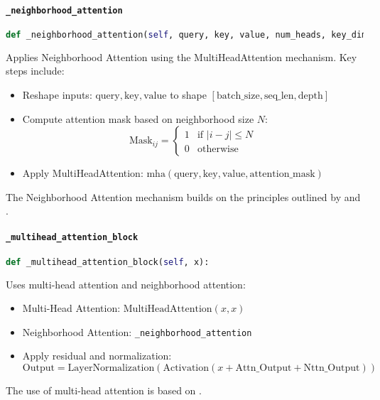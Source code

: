 \documentclass{article}
\begin{document}
	\paragraph{\texttt{\_neighborhood\_attention}}
	\begin{lstlisting}[language=Python]
		def _neighborhood_attention(self, query, key, value, num_heads, key_dim, neighborhood_size, dropout_rate=0.1):
	\end{lstlisting}
	Applies Neighborhood Attention using the MultiHeadAttention mechanism. Key steps include:
	\begin{itemize}
		\item Reshape inputs: \(\text{query}, \text{key}, \text{value}\) to shape \([ \text{batch\_size}, \text{seq\_len}, \text{depth} ]\)
		\item Compute attention mask based on neighborhood size \(N\):
		\[
		\text{Mask}_{ij} = 
		\begin{cases} 
			1 & \text{if } |i - j| \leq N \\
			0 & \text{otherwise}
		\end{cases}
		\]
		\item Apply MultiHeadAttention: \(\text{mha}(\text{query}, \text{key}, \text{value}, \text{attention\_mask})\)
	\end{itemize}
	The Neighborhood Attention mechanism builds on the principles outlined by \cite{vaswani2017attention} and \cite{parmar2018image}.
	
	\paragraph{\texttt{\_multihead\_attention\_block}}
	\begin{lstlisting}[language=Python]
		def _multihead_attention_block(self, x):
	\end{lstlisting}
	Uses multi-head attention and neighborhood attention:
	\begin{itemize}
		\item Multi-Head Attention: \( \text{MultiHeadAttention}(x, x) \)
		\item Neighborhood Attention: \texttt{\_neighborhood\_attention}
		\item Apply residual and normalization:
		\[
		\text{Output} = \text{LayerNormalization}(\text{Activation}(x + \text{Attn\_Output} + \text{Nttn\_Output}))
		\]
	\end{itemize}
	The use of multi-head attention is based on \cite{vaswani2017attention}.
	
\end{document}
